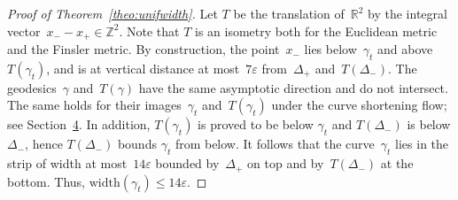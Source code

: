 \documentclass[10pt,a4paper]{amsart}
\numberwithin{equation}{section}
\newcommand{\Z}{\mathbb{Z}}
\newcommand{\R}{\mathbb{R}}
\newcommand{\width}{\mathrm{width}}
\begin{document}
\begin{proof}[Proof of Theorem~\ref{theo:unifwidth}]
Let $T$ be the translation of~$\R^2$ by the integral vector~$x_--x_+ \in \Z^2$. Note that $T$ is an isometry both for the Euclidean metric and the Finsler metric. By construction, the point~$x_-$ lies below~$\gamma_t$ and above $T(\gamma_t)$, and is at vertical distance at most~$7\varepsilon$ from~$\Delta_+$ and~$T(\Delta_-)$. The geodesics~$\gamma$ and~$T(\gamma)$ have the same asymptotic direction and do not intersect. The same holds for their images~$\gamma_t$ and~$T(\gamma_t)$ under the curve shortening flow; see Section~\href{https://ahl.centre-mersenne.org/item/AHL_2024__7__1131_0/}{4}. In addition, $T(\gamma_{t})$ is proved to be below $\gamma_{t}$ and $T(\Delta_{-})$ is below $\Delta_{-}$, hence $T(\Delta_{-})$ bounds $\gamma_{t}$ from below. It follows that the curve~$\gamma_t$ lies in the strip of width at most~$14 \varepsilon$ bounded by~$\Delta_+$ on top and by~$T(\Delta_-)$ at the bottom. Thus, $\width(\gamma_t) \leq 14 \varepsilon$.
\end{proof}
\end{document}
